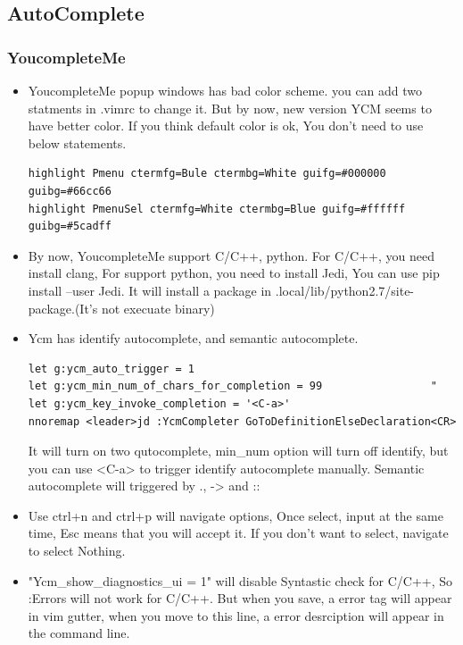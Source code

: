\documentclass[a4paper,12pt,twoside]{book}
\begin{document}
\subsection{AutoComplete}
\subsubsection{YoucompleteMe}

\begin{itemize}
\item YoucompleteMe popup windows has bad color scheme. you can add two statments in .vimrc to change it. But by now, new version YCM seems to have better color. If you think default color is ok, You don't need to use below statements. 
\begin{verbatim}
highlight Pmenu ctermfg=Bule ctermbg=White guifg=#000000 guibg=#66cc66
highlight PmenuSel ctermfg=White ctermbg=Blue guifg=#ffffff guibg=#5cadff
\end{verbatim}

\item By now, YoucompleteMe support C/C++, python. For C/C++, you need install clang, For support python, you need to install Jedi, You can use pip install --user Jedi. It will install a package in .local/lib/python2.7/site-package.(It's not execuate binary)

\item Ycm has identify autocomplete, and semantic autocomplete. 
\begin{verbatim}
let g:ycm_auto_trigger = 1
let g:ycm_min_num_of_chars_for_completion = 99                 "
let g:ycm_key_invoke_completion = '<C-a>'
nnoremap <leader>jd :YcmCompleter GoToDefinitionElseDeclaration<CR>
\end{verbatim}
It will turn on two qutocomplete, min\_num option will turn off identify, but you can use <C-a> to trigger identify autocomplete manually. Semantic autocomplete will triggered by ., -> and ::

\item Use ctrl+n and ctrl+p will navigate options, Once select, input at the same time, Esc means that you will accept it. If you don't want to select, navigate to select Nothing. 

\item "Ycm\_show\_diagnostics\_ui = 1" will disable Syntastic check for C/C++, So :Errors will not work for C/C++. But when you save, a error tag will appear in vim gutter, when you move to this line, a error desrciption will appear in the command line. 


\end{itemize}
\end{document}
